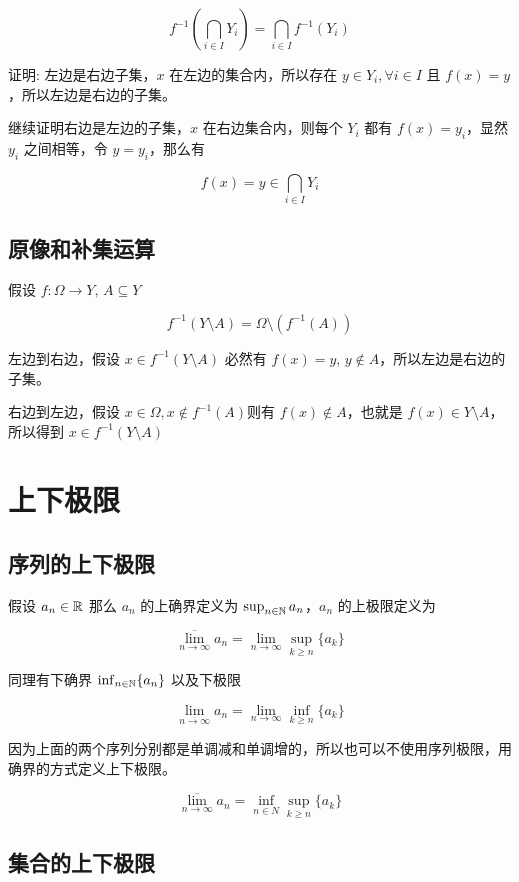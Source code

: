 \[
f^{-1}(\bigcap_{i \in I}Y_i) = \bigcap_{i \in I}f^{-1}(Y_i)
\]

证明: 左边是右边子集，$x$ 在左边的集合内，所以存在 $y \in Y_i, \forall i \in I$ 且 $f(x) = y$，所以左边是右边的子集。

继续证明右边是左边的子集，$x$ 在右边集合内，则每个 $Y_i$ 都有 $f(x) = y_i$，显然 $y_i$ 之间相等，令 $y = y_i$，那么有

\[
f(x) = y \in \bigcap_{i \in I}Y_i
\]

\subsection{原像和补集运算}

假设 $f: \Omega \to Y, \, A \subseteq Y$

\[
f^{-1}(Y \setminus A) = \Omega \setminus (f^{-1}(A))
\]

左边到右边，假设 $x \in f^{-1}(Y \setminus A)$ 必然有 $f(x) = y,\, y \notin A$，所以左边是右边的子集。

右边到左边，假设 $x \in \Omega, x \notin f^{-1}(A) $则有 $f(x) \notin A$，也就是 $f(x) \in Y \setminus A$，所以得到 $x \in f^{-1}(Y \setminus A)$

\section{上下极限}


\subsection{序列的上下极限}

假设 $a_n \in \mathbb{R}$ 那么 $a_n$ 的上确界定义为 $\sup_{n \in \mathbb{N}} a_n$，$a_n$ 的上极限定义为

\[
\overline{\lim_{n \to \infty}}a_n = \lim_{n \to \infty} \sup_{k \ge n} \{ a_k \}
\]

同理有下确界 $\inf_{n \in \mathbb{N}} \{ a_n \}$ 以及下极限

\[
\lim_{\overline{n \to \infty}}a_n = \lim_{n \to \infty} \inf_{k \ge n} \{ a_k  \}
\]

因为上面的两个序列分别都是单调减和单调增的，所以也可以不使用序列极限，用确界的方式定义上下极限。

\[
\overline{\lim_{n \to \infty}}a_n = \inf_{n \in N} \sup_{k \ge n} \{ a_k \}
\]


\subsection{集合的上下极限}

